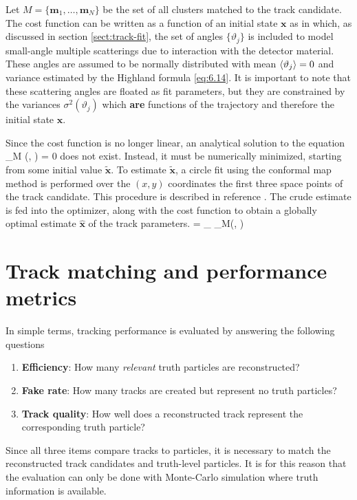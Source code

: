 Let $M=\{\mathbf{m}_1, \dotsc , \mathbf{m}_N\}$ be the set of all clusters matched to the track candidate. 
The cost function can be written as a function of an initial state $\mathbf{x}$ as
\beq
\label{eq:track-performance:5}
\eeq
in which, as discussed in section \ref{sect:track-fit}, the set of angles $\{\vartheta_j\}$ is included to model small-angle multiple scatterings due to interaction with the detector material. 
These angles are assumed to be normally distributed with mean $\expval{\vartheta_j}=0$ and variance estimated by the Highland formula \eqref{eq:6.14}. 
It is important to note that these scattering angles are floated as fit parameters, but they are constrained by the variances $\sigma^2(\vartheta_j)$ which \textbf{are} functions of the trajectory and therefore the initial state $\mathbf{x}$.

Since the cost function is no longer linear, an analytical solution to the equation 
\beq
\label{eq:track-performance:4-1}
\nabla{}_M (, {\vartheta}) = 0
\eeq
does not exist.
Instead, it must be numerically minimized, starting from some initial value $\tilde{\mathbf{x}}$.
To estimate $\tilde{\mathbf{x}}$, a circle fit using the conformal map method is performed over the $(x,y)$ coordinates the first three space points of the track candidate. 
This procedure is described in reference \cite{HANSROUL1988498}. 
The crude estimate is fed into the optimizer, along with the cost function to obtain a globally optimal estimate $\hat{\mathbf{x}}$ of the track parameters. 
\beq
\label{eq:track-performance:6}
 = \min_{} _M(, \vartheta)
\eeq


\section{Track matching and performance metrics}
\label{sect:track-match-metrics}

In simple terms, tracking performance is evaluated by answering the following questions
\begin{enumerate}
    \item \textbf{Efficiency}: How many \textit{relevant} truth particles are reconstructed?
    \item \textbf{Fake rate}: How many tracks are created but represent no truth particles?
    \item \textbf{Track quality}: How well does a reconstructed track represent the corresponding truth particle?
\end{enumerate}
Since all three items compare tracks to particles, it is necessary to match the reconstructed track candidates and truth-level particles. 
It is for this reason that the evaluation can only be done with Monte-Carlo simulation where truth information is available. 

